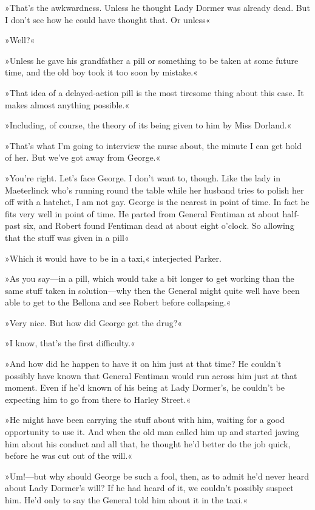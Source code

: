 »That's the awkwardness. Unless he thought Lady Dormer was already dead. But I don't see how he could have thought that. Or unless\longdash«

»Well?«

»Unless he gave his grandfather a pill or something to be taken at some future time, and the old boy took it too soon by mistake.«

»That idea of a delayed-action pill is the most tiresome thing about this case. It makes almost anything possible.«

»Including, of course, the theory of its being given to him by Miss Dorland.«

»That's what I'm going to interview the nurse about, the minute I can get hold of her. But we've got away from George.«

»You're right. Let's face George. I don't want to, though. Like the lady in Maeterlinck who's running round the table while her husband tries to polish her off with a hatchet, I am not gay. George is the nearest in point of time. In fact he fits very well in point of time. He parted from General Fentiman at about half-past six, and Robert found Fentiman dead at about eight o'clock. So allowing that the stuff was given in a pill\longdash«

»Which it would have to be in a taxi,« interjected Parker.

»As you say\allowbreak---\allowbreak in a pill, which would take a bit longer to get working than the same stuff taken in solution\allowbreak---\allowbreak why then the General might quite well have been able to get to the Bellona and see Robert before collapsing.«

»Very nice. But how did George get the drug?«

»I know, that's the first difficulty.«

»And how did he happen to have it on him just at that time? He couldn't possibly have known that General Fentiman would run across him just at that moment. Even if he'd known of his being at Lady Dormer's, he couldn't be expecting him to go from there to Harley Street.«

»He might have been carrying the stuff about with him, waiting for a good opportunity to use it. And when the old man called him up and started jawing him about his conduct and all that, he thought he'd better do the job quick, before he was cut out of the will.«

»Um!---but why should George be such a fool, then, as to admit he'd never heard about Lady Dormer's will? If he had heard of it, we couldn't possibly suspect him. He'd only to say the General told him about it in the taxi.«

